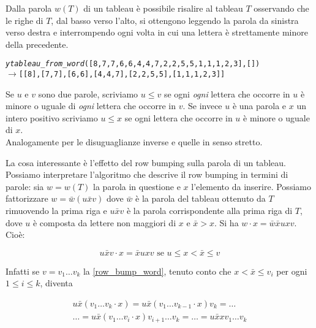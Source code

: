 \begin{oss}
Dalla parola $w(T)$ di un tableau \`e possibile risalire al tableau
$T$ osservando che le righe di $T$, dal basso verso l'alto, si
ottengono leggendo la parola da sinistra verso destra e interrompendo
ogni volta in cui una lettera \`e strettamente minore della
precedente.
\begin{alltt}
\emph{ytableau\_from\_word} ([8,7,7,6,6,4,4,7,2,2,5,5,1,1,1,2,3], [])
\(\rightarrow\) [[8],[7,7],[6,6],[4,4,7],[2,2,5,5],[1,1,1,2,3]]
\end{alltt}
\end{oss}

\begin{notaz}
Se $u$ e $v$ sono due parole, scriviamo $u \leq v$ se ogni
\emph{ogni} lettera che occorre in $u$ \`e minore o uguale di \emph{ogni} lettera
che occorre in $v$. Se invece $u$ \`e una parola e $x$ un intero
positivo scriviamo $u \leq x$ se ogni lettera che occorre in $u$ \`e
minore o uguale di $x$.\\
Analogamente per le disuguaglianze inverse e quelle in senso stretto. 
\end{notaz}

La cosa interessante \`e l'effetto del row bumping sulla
parola di un tableau. 
Possiamo interpretare l'algoritmo che descrive
il row bumping in termini di parole: sia $w = w(T)$ la parola in questione e
$x$ l'elemento da inserire. Possiamo fattorizzare $w=\bar w (u \bar x
v)$ dove $\bar w$ \`e la parola del tableau ottenuto da $T$ rimuovendo
la prima riga e $u \bar x v$ \`e la parola corrispondente
alla prima riga di $T$, dove $u$ \`e composta da lettere non maggiori
di $x$ e $\bar x > x$. Si ha $w \cdot x = \bar w \bar x u x
v$. Cio\`e:

\begin{equation}\label{row_bump_word}
u \bar x v \cdot x = \bar x u
  x v \mbox{ se } u \leq x < \bar x \leq v
\end{equation}

Infatti se $v=v_1 \ldots v_k$ la \eqref{row_bump_word}, tenuto conto che
$x < \bar x \leq v_i$ per ogni $1 \leq i \leq k$, diventa

\begin{equation}\label{pre_bump}
\begin{split}
u \bar x (v_1 \ldots v_k \cdot x)
= u \bar x (v_1 \ldots v_{k-1}
\cdot x )v_k = \ldots\\
\ldots = u \bar x (v_1 \ldots
v_i \cdot x )v_{i+1} \ldots v_k = \ldots
= u \bar x x v_1 \ldots v_k
\end{split}
\end{equation}

